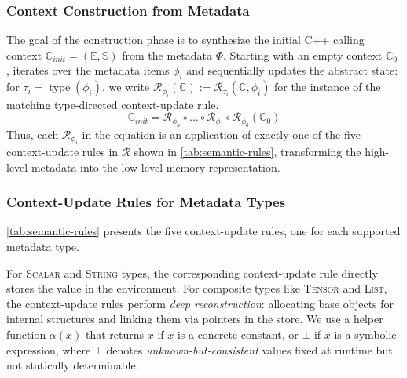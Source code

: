 \subsubsection{Context Construction from Metadata}\label{sec:design:update}

The goal of the construction phase is to synthesize the initial C++ calling context $\mathbb{C}_{init} = (\mathbb{E}, \mathbb{S})$ from the metadata $\Phi$.
Starting with an empty context $\mathbb{C}_{0}$ , \mysys{} iterates over the metadata items $\phi_i$ and sequentially updates  the abstract state:
for $\tau_i = \operatorname{type}(\phi_i)$, we write $\mathcal{R}_{\phi_i}(\mathbb{C}) := \mathcal{R}_{\tau_i}(\mathbb{C}, \phi_i)$ for the instance of the matching type-directed context-update rule.
\begin{equation}
	\mathbb{C}_{init} = \mathcal{R}_{\phi_n} \circ \dots \circ \mathcal{R}_{\phi_1} \circ \mathcal{R}_{\phi_0} (\mathbb{C}_0)
\end{equation}
Thus, each $\mathcal{R}_{\phi_i}$ in the equation is an application of exactly one of the five context-update rules in $\mathcal{R}$ shown in \autoref{tab:semantic-rules}, transforming the high-level metadata into the low-level memory representation.

\subsubsection{Context-Update Rules for Metadata Types}\label{sec:design:rules}

\autoref{tab:semantic-rules} presents the five context-update rules, one for each supported metadata type.



For \textsc{Scalar} and \textsc{String} types, the corresponding context-update rule directly stores the value in the environment.
For composite types like \textsc{Tensor} and \textsc{List}, the context-update rules perform \textit{deep reconstruction}: allocating base objects for internal structures and linking them via pointers in the store.
We use a helper function $\alpha(x)$ that returns $x$ if $x$ is a concrete constant, or $\bot$ if $x$ is a symbolic expression, where $\bot$ denotes \textit{unknown-but-consistent} values fixed at runtime but not statically determinable.

